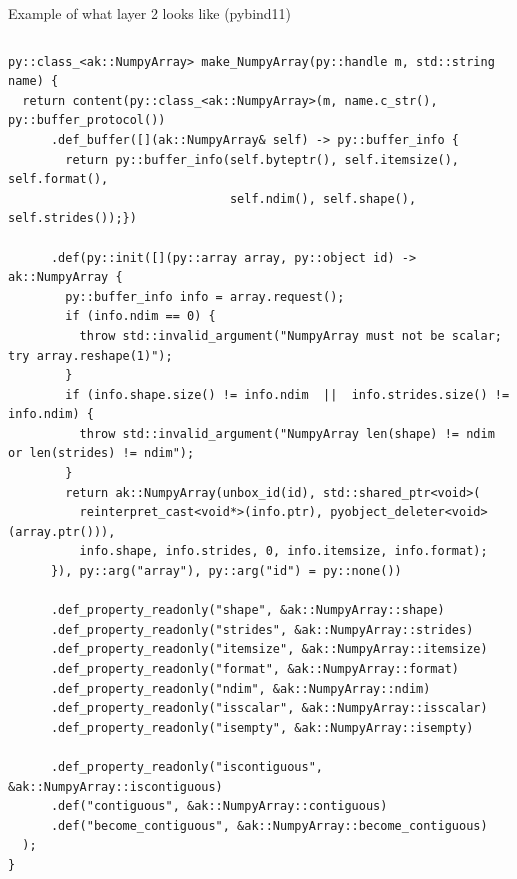 \documentclass[aspectratio=169]{beamer}
\begin{document}
\begin{frame}[fragile]{Example of what layer 2 looks like (pybind11)}
\tiny
\vspace{0.05 cm}
\begin{columns}
\begin{verbatim}
py::class_<ak::NumpyArray> make_NumpyArray(py::handle m, std::string name) {
  return content(py::class_<ak::NumpyArray>(m, name.c_str(), py::buffer_protocol())
      .def_buffer([](ak::NumpyArray& self) -> py::buffer_info {
        return py::buffer_info(self.byteptr(), self.itemsize(), self.format(),
                               self.ndim(), self.shape(), self.strides());})

      .def(py::init([](py::array array, py::object id) -> ak::NumpyArray {
        py::buffer_info info = array.request();
        if (info.ndim == 0) {
          throw std::invalid_argument("NumpyArray must not be scalar; try array.reshape(1)");
        }
        if (info.shape.size() != info.ndim  ||  info.strides.size() != info.ndim) {
          throw std::invalid_argument("NumpyArray len(shape) != ndim or len(strides) != ndim");
        }
        return ak::NumpyArray(unbox_id(id), std::shared_ptr<void>(
          reinterpret_cast<void*>(info.ptr), pyobject_deleter<void>(array.ptr())),
          info.shape, info.strides, 0, info.itemsize, info.format);
      }), py::arg("array"), py::arg("id") = py::none())

      .def_property_readonly("shape", &ak::NumpyArray::shape)
      .def_property_readonly("strides", &ak::NumpyArray::strides)
      .def_property_readonly("itemsize", &ak::NumpyArray::itemsize)
      .def_property_readonly("format", &ak::NumpyArray::format)
      .def_property_readonly("ndim", &ak::NumpyArray::ndim)
      .def_property_readonly("isscalar", &ak::NumpyArray::isscalar)
      .def_property_readonly("isempty", &ak::NumpyArray::isempty)

      .def_property_readonly("iscontiguous", &ak::NumpyArray::iscontiguous)
      .def("contiguous", &ak::NumpyArray::contiguous)
      .def("become_contiguous", &ak::NumpyArray::become_contiguous)
  );
}
\end{verbatim}
\end{columns}
\end{frame}
\end{document}
